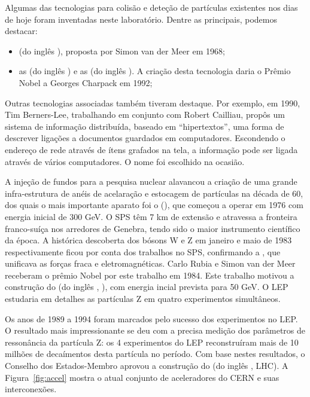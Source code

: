 Algumas das tecnologias para colisão e deteção de partículas existentes nos
dias de hoje foram inventadas neste laboratório. Dentre as principais, podemos
destacar:

\begin{itemize}
\item {} (do inglês
), proposta por Simon van der Meer em
1968;

\item as  (do inglês
) e as  (do
inglês ). A criação desta tecnologia daria o Prêmio
Nobel a Georges Charpack em 1992;
\end{itemize}

Outras tecnologias associadas também tiveram destaque. Por exemplo, em 1990,
Tim Berners-Lee, trabalhando em conjunto com Robert Cailliau, propôs um
sistema de informação distribuída, baseado em ``hipertextos'', uma forma de
descrever ligações a documentos guardados em computadores. Escondendo o
endereço de rede através de ítens grafados na tela, a informação pode ser
ligada através de vários computadores. O nome  foi
escolhido na ocasião.

A injeção de fundos para a pesquisa nuclear alavancou a criação de uma grande
infra-estrutura de anéis de acelaração e estocagem de partículas na década de
60, dos quais o mais importante aparato foi o  (), que começou a operar em 1976 com energia inicial de
300 GeV. O SPS têm 7 km de extensão e atravessa a fronteira franco-suíça nos
arredores de Genebra, tendo sido o maior instrumento científico da época.  A
histórica descoberta dos bósons W e Z em janeiro e maio de 1983
respectivamente ficou por conta dos trabalhos no SPS, confirmando a
, que unificava as forças fraca e
eletromagnéticas. Carlo Rubia e Simon van der Meer
receberam o prêmio Nobel por este trabalho em 1984. Este trabalho motivou a
construção do  (do inglês
, ), com energia incial
prevista para 50 GeV. O LEP estudaria em detalhes as partículas Z em quatro
experimentos simultâneos.

Os anos de 1989 a 1994 foram marcados pelo sucesso dos experimentos no LEP. O
resultado mais impressionante se deu com a precisa medição dos parâmetros de
ressonância da partícula Z: os 4 experimentos do LEP reconstruíram mais de 10
milhões de decaímentos desta partícula no período. Com base nestes resultados,
o Conselho dos Estados-Membro aprovou a construção do  (do inglês , LHC). A
Figura~\ref{fig:accel} mostra o atual conjunto de aceleradores do CERN e suas
interconexões.

